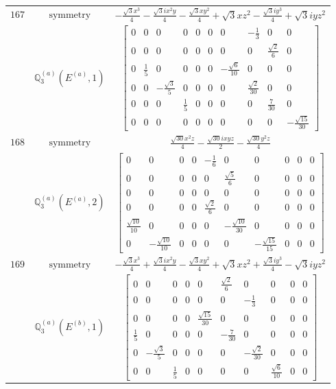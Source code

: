 \documentclass[fleqn,8pt,landscape]{jsarticle}
\begin{document}
\begin{longtable}{ccc}
$ 167 $ & $ \text{symmetry} $ & $ - \frac{\sqrt{3} x^{3}}{4} - \frac{\sqrt{3} i x^{2} y}{4} - \frac{\sqrt{3} x y^{2}}{4} + \sqrt{3} x z^{2} - \frac{\sqrt{3} i y^{3}}{4} + \sqrt{3} i y z^{2} $ \\
$  $ & $ \mathbb{Q}_{3}^{(a)}(E^{(a)},1) $ & $ \begin{bmatrix} 0 & 0 & 0 & 0 & 0 & 0 & 0 & - \frac{1}{3} & 0 & 0 \\ 0 & 0 & 0 & 0 & 0 & 0 & 0 & 0 & \frac{\sqrt{2}}{6} & 0 \\ 0 & \frac{1}{5} & 0 & 0 & 0 & 0 & - \frac{\sqrt{6}}{10} & 0 & 0 & 0 \\ 0 & 0 & - \frac{\sqrt{3}}{5} & 0 & 0 & 0 & 0 & \frac{\sqrt{2}}{30} & 0 & 0 \\ 0 & 0 & 0 & \frac{1}{5} & 0 & 0 & 0 & 0 & \frac{7}{30} & 0 \\ 0 & 0 & 0 & 0 & 0 & 0 & 0 & 0 & 0 & - \frac{\sqrt{15}}{30} \end{bmatrix} $ \\ \hline
$ 168 $ & $ \text{symmetry} $ & $ \frac{\sqrt{30} x^{2} z}{4} - \frac{\sqrt{30} i x y z}{2} - \frac{\sqrt{30} y^{2} z}{4} $ \\
$  $ & $ \mathbb{Q}_{3}^{(a)}(E^{(a)},2) $ & $ \begin{bmatrix} 0 & 0 & 0 & 0 & - \frac{1}{6} & 0 & 0 & 0 & 0 & 0 \\ 0 & 0 & 0 & 0 & 0 & \frac{\sqrt{5}}{6} & 0 & 0 & 0 & 0 \\ 0 & 0 & 0 & 0 & 0 & 0 & 0 & 0 & 0 & 0 \\ 0 & 0 & 0 & 0 & \frac{\sqrt{2}}{6} & 0 & 0 & 0 & 0 & 0 \\ \frac{\sqrt{10}}{10} & 0 & 0 & 0 & 0 & - \frac{\sqrt{10}}{30} & 0 & 0 & 0 & 0 \\ 0 & - \frac{\sqrt{10}}{10} & 0 & 0 & 0 & 0 & - \frac{\sqrt{15}}{15} & 0 & 0 & 0 \end{bmatrix} $ \\ \hline
$ 169 $ & $ \text{symmetry} $ & $ - \frac{\sqrt{3} x^{3}}{4} + \frac{\sqrt{3} i x^{2} y}{4} - \frac{\sqrt{3} x y^{2}}{4} + \sqrt{3} x z^{2} + \frac{\sqrt{3} i y^{3}}{4} - \sqrt{3} i y z^{2} $ \\
$  $ & $ \mathbb{Q}_{3}^{(a)}(E^{(b)},1) $ & $ \begin{bmatrix} 0 & 0 & 0 & 0 & 0 & \frac{\sqrt{2}}{6} & 0 & 0 & 0 & 0 \\ 0 & 0 & 0 & 0 & 0 & 0 & - \frac{1}{3} & 0 & 0 & 0 \\ 0 & 0 & 0 & 0 & \frac{\sqrt{15}}{30} & 0 & 0 & 0 & 0 & 0 \\ \frac{1}{5} & 0 & 0 & 0 & 0 & - \frac{7}{30} & 0 & 0 & 0 & 0 \\ 0 & - \frac{\sqrt{3}}{5} & 0 & 0 & 0 & 0 & - \frac{\sqrt{2}}{30} & 0 & 0 & 0 \\ 0 & 0 & \frac{1}{5} & 0 & 0 & 0 & 0 & \frac{\sqrt{6}}{10} & 0 & 0 \end{bmatrix} $ \\ \hline

\end{longtable}
\end{document}
